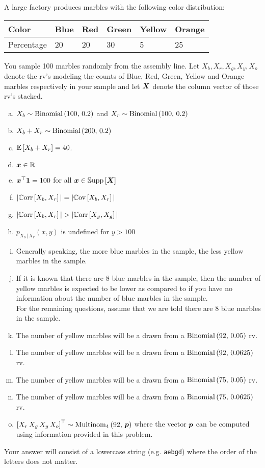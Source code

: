\documentclass[12pt,landscape]{article}
\newcommand{\instr}{\small Your answer will consist of a lowercase string (e.g. \texttt{aebgd}) where the order of the letters does not matter. \normalsize}
\begin{document}
\problem{} A large factory produces marbles with the following color distribution:

\begin{table}[h]
\centering
\begin{tabular}{l|lllll}
Color 			& Blue & Red & Green & Yellow & Orange \\ \hline
Percentage	     & 20    & 20   & 30      & 5        & 25
\end{tabular}
\end{table}

\noindent You sample 100 marbles randomly from the assembly line. Let $X_b, X_r, X_g, X_y, X_o$ denote the rv's modeling the counts of Blue, Red, Green, Yellow and Orange marbles respectively in your sample and let $\boldsymbol{X}$ denote the column vector of those rv's stacked.

\vspace{-0.2cm}\benum{} 

\begin{enumerate}[(a)]
\item $X_b \sim \mathrm{Binomial}\left(100,\,0.2\right)$ and $X_r \sim \mathrm{Binomial}\left(100,\,0.2\right)$
\item $X_b + X_r \sim \mathrm{Binomial}\left(200,\,0.2\right)$
\item $\mathbb{E}\left[X_b + X_r\right] = 40$.
\item $\boldsymbol{x} \in \mathbb{R}$ 
\item $\boldsymbol{x}^\top \boldsymbol{1} = 100$ for all $\boldsymbol{x} \in \mathbb{S}\text{upp}\left[\boldsymbol{X}\right]$
\item $|\mathbb{C}\text{orr}\left[X_b, X_r\right]| = |\mathbb{C}\text{ov}\left[X_b, X_r\right]|$
\item $|\mathbb{C}\text{orr}\left[X_b, X_r\right]| > |\mathbb{C}\text{orr}\left[X_y, X_g\right]|$
\item $p_{X_b\,|\,X_r}(x, y)$ is undefined for $y > 100$
\item Generally speaking, the more blue marbles in the sample, the less yellow marbles in the sample.
\item If it is known that there are 8 blue marbles in the sample, then the number of yellow marbles is expected to be lower as compared to if you have no information about the number of blue marbles in the sample.\\

For the remaining questions, assume that we are told there are 8 blue marbles in the sample.
\item The number of yellow marbles will be a drawn from a $\mathrm{Binomial}\left(92,\,0.05\right)$ rv.
\item The number of yellow marbles will be a drawn from a $\mathrm{Binomial}\left(92,\,0.0625\right)$ rv.
\item The number of yellow marbles will be a drawn from a $\mathrm{Binomial}\left(75,\,0.05\right)$ rv.
\item The number of yellow marbles will be a drawn from a $\mathrm{Binomial}\left(75,\,0.0625\right)$ rv.
\item $\left[X_r\, X_g\, X_y\, X_o\right]^\top \sim \mathrm{Multinom}_{4}\left(92,\,\boldsymbol{p}\right)$ where the vector $\boldsymbol{p}$ can be computed using information provided in this problem.
\end{enumerate}
\eenum\instr\pagebreak
\end{document}
